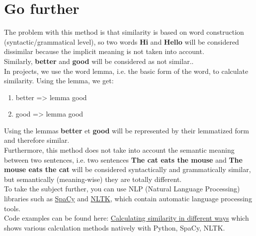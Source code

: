 \documentclass[a4paper, 14pt]{article}
\begin{document}
    \section{Go further}
    The problem with this method is that similarity is based on word construction (syntactic/grammatical level), so two words \textbf{Hi} and \textbf{Hello} will be considered dissimilar because the implicit meaning is not taken into account.\\
    Similarly, \textbf{better} and \textbf{good} will be considered as not similar..\\
    In projects, we use the word lemma, i.e. the basic form of the word, to calculate similarity.
	Using the lemma, we get:
    \begin{enumerate}
    	\item[\textbullet] better => lemma good
    	\item[\textbullet] good => lemma good
    \end{enumerate}
    Using the lemmas \textbf{better} et \textbf{good} will be represented by their lemmatized form and therefore similar.\\
    Furthermore, this method does not take into account the semantic meaning between two sentences, i.e. two sentences \textbf{The cat eats the mouse} and \textbf{The mouse eats the cat} will be considered syntactically and grammatically similar, but semantically (meaning-wise) they are totally different.\\
    To take the subject further, you can use NLP (Natural Language Processing) libraries such as \href{https://spacy.io/}{SpaCy} and \href{https://www.nltk.org/}{NLTK}, which contain automatic language processing tools.\\
	Code examples can be found here:  \href{https://github.com/tisma95/articles/tree/master/cosine-similarity/sentence-similarities-benchmark}{Calculating similarity in different ways} which shows various calculation methods natively with Python, SpaCy, NLTK.
\end{document}
